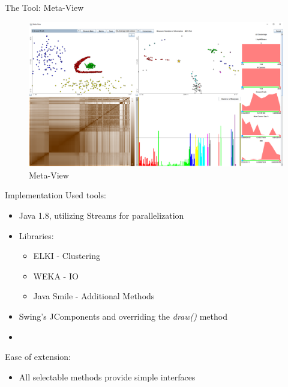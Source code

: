 \documentclass[aspectratio=169]{beamer}
\begin{document}
\begin{frame}{The Tool: Meta-View}
	
	\begin{figure}
	  \centering
	    \includegraphics[width=.9\textwidth]{meta-view}
	  \caption{Meta-View}
	  \label{fig:meta-view}
	\end{figure}

\end{frame}


\begin{frame}{Implementation}
Used tools:
	\begin{itemize}
		\item Java 1.8, utilizing Streams for parallelization
		\item Libraries:
		\begin{itemize}
			\item  ELKI \cite{10.1007/978-3-540-69497-7_41} - Clustering
			\item WEKA \cite{10.1145/1656274.1656278} - IO
			\item Java Smile \cite{javasmile} - Additional Methods
		\end{itemize}
		\item Swing's JComponents and overriding the \emph{draw()} method
		\item[]
	\end{itemize}
Ease of extension:
	\begin{itemize}
		\item All selectable methods provide simple interfaces
	\end{itemize}
\end{frame}
\end{document}
